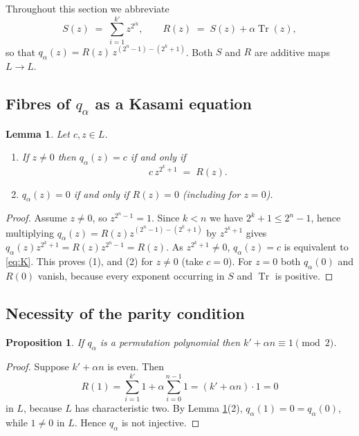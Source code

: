 \documentclass[11pt,a4paper]{article}
\newtheorem{proposition}[theorem]{Proposition}
\newtheorem{lemma}[theorem]{Lemma}
\theoremstyle{definition}
\newcommand{\Tr}{\operatorname{Tr}}
\newcommand{\rhs}{R}
\begin{document}
Throughout this section we abbreviate
\[
  S(z)\;=\;\sum_{i=1}^{k'}z^{2^{ik}},\qquad
  \rhs(z)\;=\;S(z)+\alpha\Tr(z),
\]
so that $q_\alpha(z)=\rhs(z)\,z^{(2^{n}-1)-(2^{k}+1)}$.  Both $S$ and $\rhs$ are
additive maps $L\to L$.

\subsection{Fibres of $q_\alpha$ as a Kasami equation}

\begin{lemma}\label{lem:fibre}
Let $c,z\in L$.
\begin{enumerate}
\item If $z\neq0$ then $q_\alpha(z)=c$ if and only if
      \begin{equation}\label{eq:K}
        c\,z^{2^{k}+1}\;=\;\rhs(z). \tag{K}
      \end{equation}
\item $q_\alpha(z)=0$ if and only if $\rhs(z)=0$ (including for $z=0$).
\end{enumerate}
\end{lemma}

\begin{proof}
Assume $z\neq0$, so $z^{2^{n}-1}=1$.  Since $k<n$ we have $2^{k}+1\le 2^{n}-1$,
hence multiplying $q_\alpha(z)=\rhs(z)z^{(2^{n}-1)-(2^{k}+1)}$ by $z^{2^{k}+1}$
gives $q_\alpha(z)z^{2^{k}+1}=\rhs(z)z^{2^{n}-1}=\rhs(z)$.  As $z^{2^{k}+1}\neq0$,
$q_\alpha(z)=c$ is equivalent to \eqref{eq:K}.  This proves (1), and (2) for
$z\neq 0$ (take $c=0$).  For $z=0$ both $q_\alpha(0)$ and $\rhs(0)$ vanish, because
every exponent occurring in $S$ and $\Tr$ is positive.
\end{proof}

\subsection{Necessity of the parity condition}

\begin{proposition}\label{prop:necessity}
If $q_\alpha$ is a permutation polynomial then $k'+\alpha n\equiv1\pmod2$.
\end{proposition}

\begin{proof}
Suppose $k'+\alpha n$ is even.  Then
\[
  \rhs(1)=\sum_{i=1}^{k'}1+\alpha\sum_{i=0}^{n-1}1=(k'+\alpha n)\cdot 1=0
\]
in $L$, because $L$ has characteristic two.  By Lemma \ref{lem:fibre}(2),
$q_\alpha(1)=0=q_\alpha(0)$, while $1\neq0$ in $L$.  Hence $q_\alpha$ is not
injective.
\end{proof}
\end{document}
